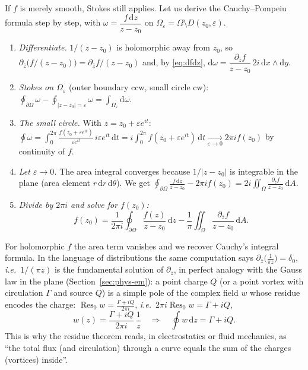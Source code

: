 \documentclass[11pt,a4paper]{article}
\numberwithin{equation}{section}
\theoremstyle{definition}
\theoremstyle{plain}
\newcommand{\dd}{\mathrm{d}}
\newcommand{\Res}{\operatorname{Res}}
\newcommand{\ie}{\emph{i.e.}\ }
\begin{document}
If $f$ is merely smooth, Stokes still applies. Let us derive the Cauchy--Pompeiu formula step by step, with $\omega=\dfrac{f\,\dd z}{z-z_0}$ on $\Omega_\varepsilon=\Omega\setminus D(z_0,\varepsilon)$.
\begin{enumerate}
\item \emph{Differentiate.} $1/(z-z_0)$ is holomorphic away from $z_0$, so $\partial_{\bar z}\bigl(f/(z-z_0)\bigr)=\partial_{\bar z}f/(z-z_0)$ and, by \eqref{eq:dfdz}, $\dd\omega=\dfrac{\partial_{\bar z}f}{z-z_0}\,2i\,\dd x\wedge\dd y$.
\item \emph{Stokes on $\Omega_\varepsilon$} (outer boundary ccw, small circle cw): $\displaystyle\oint_{\partial\Omega}\omega-\oint_{|z-z_0|=\varepsilon}\omega=\int_{\Omega_\varepsilon}\dd\omega$.
\item \emph{The small circle.} With $z=z_0+\varepsilon e^{it}$: $\displaystyle\oint\omega=\int_0^{2\pi}\frac{f(z_0+\varepsilon e^{it})}{\varepsilon e^{it}}\,i\varepsilon e^{it}\,\dd t=i\int_0^{2\pi}f(z_0+\varepsilon e^{it})\,\dd t\xrightarrow[\varepsilon\to0]{}2\pi if(z_0)$ by continuity of $f$.
\item \emph{Let $\varepsilon\to0$.} The area integral converges because $1/|z-z_0|$ is integrable in the plane (area element $r\,\dd r\,\dd\theta$). We get $\displaystyle\oint_{\partial\Omega}\frac{f\,\dd z}{z-z_0}-2\pi if(z_0)=2i\iint_\Omega\frac{\partial_{\bar z}f}{z-z_0}\,\dd A$.
\item \emph{Divide by $2\pi i$ and solve for $f(z_0)$:}
\begin{equation}\label{eq:pompeiu}
f(z_0)=\frac1{2\pi i}\oint_{\partial\Omega}\frac{f(z)}{z-z_0}\,\dd z-\frac1\pi\iint_\Omega\frac{\partial_{\bar z}f}{z-z_0}\,\dd A .
\end{equation}
\end{enumerate}
For holomorphic $f$ the area term vanishes and we recover Cauchy's integral formula. In the language of distributions the same computation says $\partial_{\bar z}\bigl(\frac1{\pi z}\bigr)=\delta_0$, \ie $1/(\pi z)$ is the fundamental solution of $\partial_{\bar z}$, in perfect analogy with the Gauss law in the plane (Section~\ref{sec:phys-em}): a point charge $Q$ (or a point vortex with circulation $\Gamma$ and source $Q$) is a simple pole of the complex field $w$ whose residue encodes the charge: $\Res_0w=\frac{\Gamma+iQ}{2\pi i}$, \ie $2\pi i\Res_0w=\Gamma+iQ$,
\[
w(z)=\frac{\Gamma+iQ}{2\pi i}\,\frac1z\quad\Longrightarrow\quad\oint w\,\dd z=\Gamma+iQ .
\]
This is why the residue theorem reads, in electrostatics or fluid mechanics, as ``the total flux (and circulation) through a curve equals the sum of the charges (vortices) inside''.
\end{document}
